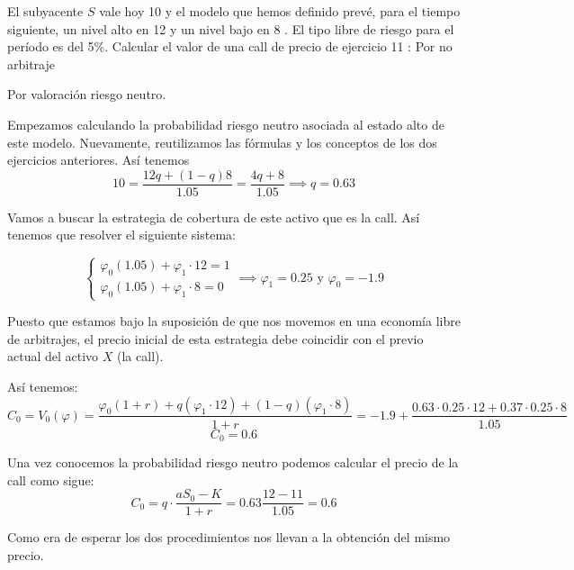 \begin{problem}[3]
El subyacente $S$ vale hoy 10 \texteuro y el modelo que hemos definido prevé, para el tiempo siguiente, un nivel alto en 12 \texteuro y un nivel bajo en 8 \texteuro. El tipo libre de riesgo para el período es del 5\%. Calcular el valor de una call de precio de ejercicio 11 \texteuro:
\ppart Por no arbitraje

\ppart Por valoración riesgo neutro.
\solution

Empezamos calculando la probabilidad riesgo neutro asociada al estado alto de este modelo. Nuevamente, reutilizamos las fórmulas y los conceptos de los dos ejercicios anteriores. Así tenemos
\[10 = \frac{12q + (1-q)8}{1.05} = \frac{4q+8}{1.05} \implies q=0.63\]

\spart

Vamos a buscar la estrategia de cobertura de este activo que es la call. Así tenemos que resolver el siguiente sistema:

\[\left\{ \begin{array}{l}
\varphi_0(1.05) + \varphi_1\cdot 12 = 1 \\
\varphi_0(1.05) + \varphi_1\cdot 8 = 0
\end{array}\right. \implies \varphi_1 = 0.25 \text{ y } \varphi_0 = -1.9\]

Puesto que estamos bajo la suposición de que nos movemos en una economía libre de arbitrajes, el precio inicial de esta estrategia debe coincidir con el previo actual del activo $X$ (la call).

Así tenemos:
\[C_0 = V_0(\varphi) = \frac{\varphi_0(1+r) + q(\varphi_1 \cdot 12) + (1-q)(\varphi_1\cdot 8)}{1+r} = -1.9 + \frac{0.63 \cdot 0.25\cdot 12 + 0.37 \cdot 0.25 \cdot 8}{1.05}\]
\[C_0 = 0.6\]
\spart

Una vez conocemos la probabilidad riesgo neutro podemos calcular el precio de la call como sigue:
\[C_0 = q\cdot \frac{aS_0 - K}{1+r} = 0.63 \frac{12-11}{1.05} = 0.6\]

Como era de esperar los dos procedimientos nos llevan a la obtención del mismo precio.
\end{problem}

